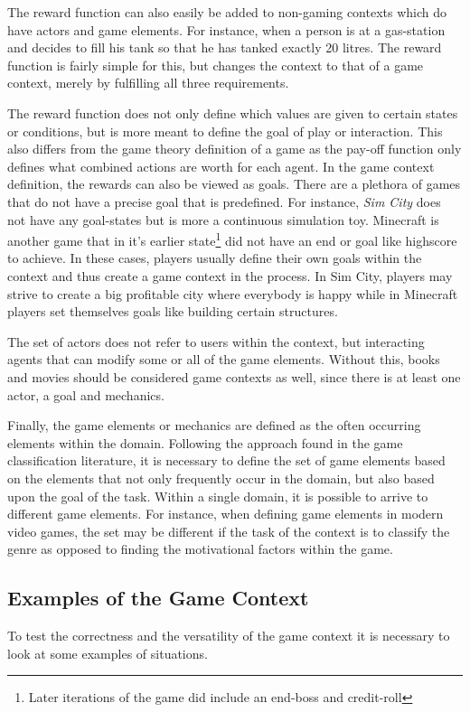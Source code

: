 \documentclass[11pt]{article}
\begin{document}
The reward function can also easily be added to non-gaming contexts which do have actors and game elements. For instance, when a person is at a gas-station and decides to fill his tank so that he has tanked exactly 20 litres. The reward function is fairly simple for this, but changes the context to that of a game context, merely by fulfilling all three requirements. 

The reward function does not only define which values are given to certain states or conditions, but is more meant to define the goal of play or interaction. This also differs from the game theory definition of a game as the pay-off function only defines what combined actions are worth for each agent. In the game context definition, the rewards can also be viewed as goals. There are a plethora of games that do not have a precise goal that is predefined. For instance, \emph{Sim City} does not have any goal-states but is more a continuous simulation toy. Minecraft is another game that in it's earlier state\footnote{Later iterations of the game did include an end-boss and credit-roll} did not have an end or goal like highscore to achieve. In these cases, players usually define their own goals within the context and thus create a game context in the process. In Sim City, players may strive to create a big profitable city where everybody is happy while in Minecraft players set themselves goals like building 
certain structures.

The set of actors does not refer to users within the context, but interacting agents that can modify some or all of the game elements. Without this, books and movies should be considered game contexts as well, since there is at least one actor, a goal and mechanics. 

Finally, the game elements or mechanics are defined as the often occurring elements within the domain. Following the approach found in the game classification literature, it is necessary to define the set of game elements based on the elements that not only frequently occur in the domain, but also based upon the goal of the task. Within a single domain, it is possible to arrive to different game elements. For instance, when defining game elements in modern video games, the set may be different if the task of the context is to classify the genre as opposed to finding the motivational factors within the game.

\subsection{Examples of the Game Context}
To test the correctness and the versatility of the game context it is necessary to look at some examples of situations.
\end{document}
